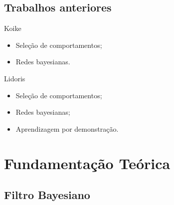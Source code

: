 \documentclass{beamer}
\begin{document}

\subsection{Trabalhos anteriores}

\begin{frame}
Koike
\begin{itemize}
	\item Seleção de comportamentos;
	\item Redes bayesianas.
\end{itemize}
\end{frame}


\begin{frame}
Lidoris
\begin{itemize}
	\item Seleção de comportamentos;
	\item Redes bayesianas;
	\item Aprendizagem por demonstração.
\end{itemize}
\end{frame}

\section{Fundamentação Teórica}

\subsection{Filtro Bayesiano}
\end{document}
